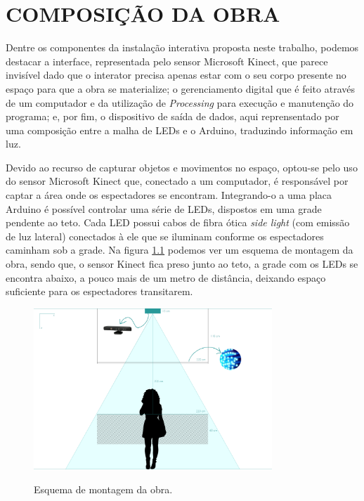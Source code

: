 \chapter{COMPOSIÇÃO DA OBRA}

Dentre os componentes da instalação interativa proposta neste trabalho, podemos destacar a interface, representada pelo sensor Microsoft Kinect, que parece invisível dado que o interator precisa apenas estar com o seu corpo presente no espaço para que a obra se materialize; o gerenciamento digital que é feito através de um computador e da utilização de \textit{Processing} para execução e manutenção do programa; e, por fim, o dispositivo de saída de dados, aqui reprensentado por uma composição entre a malha de LEDs e o Arduino, traduzindo informação em luz.

Devido ao recurso de capturar objetos e movimentos no espaço, optou-se pelo uso do sensor Microsoft Kinect que, conectado a um computador, é responsável por captar a área onde os espectadores se encontram. Integrando-o a uma placa Arduino é possível controlar uma série de LEDs, dispostos em uma grade pendente ao teto. Cada LED possui cabos de fibra ótica \textit{side light} (com emissão de luz lateral) conectados à ele que se iluminam conforme os espectadores caminham sob a grade. Na figura \ref{fig:esquema} podemos ver um esquema de montagem da obra, sendo que, o sensor Kinect fica preso junto ao teto, a grade com os LEDs se encontra abaixo, a pouco mais de um metro de distância, deixando espaço suficiente para os espectadores transitarem.

\begin{figure}[H]
    \centering
    \caption{Esquema de montagem da obra.}
	\vspace*{0,2cm}
    \includegraphics[width=0.8\textwidth]{./04-figuras/esquema}
    \label{fig:esquema}
\end{figure}
\vspace*{-0,9cm}
{\raggedright {}}\\

